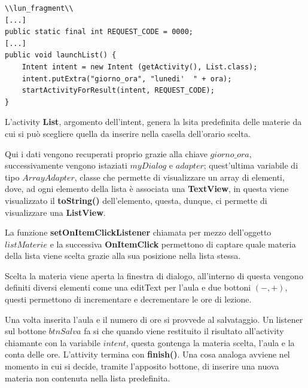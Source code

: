 \documentclass[a4paper, 50pt, twoside]{article}
\begin{document}
\begin{lstlisting}
\\lun_fragment\\
[...]
public static final int REQUEST_CODE = 0000;
[...]
public void launchList() {
	Intent intent = new Intent (getActivity(), List.class);
	intent.putExtra("giorno_ora", "lunedi'  " + ora);
	startActivityForResult(intent, REQUEST_CODE);
}
\end{lstlisting}

L'activity \textbf{List}, argomento dell'intent, genera la lsita predefinita delle materie da cui si può scegliere quella da inserire nella casella dell'orario scelta.

Qui i dati vengono recuperati proprio grazie alla chiave $giorno\_ora$, successivamente vengono istaziati $myDialog$ e $adapter$; quest'ultima variabile di tipo $ArrayAdapter$, classe che permette di visualizzare un array di elementi, dove, ad ogni elemento della lista è associata una \textbf{TextView}, in questa viene visualizzato il \textbf{toString()} dell'elemento, questa, dunque, ci permette di visualizzare una \textbf{ListView}.

La funzione \textbf{setOnItemClickListener} chiamata per mezzo dell'oggetto $listMaterie$ e la successiva \textbf{OnItemClick} permettono di captare quale materia della lista viene scelta grazie alla sua posizione nella lista stessa.

Scelta la materia viene aperta la finestra di dialogo, all'interno di questa vengono definiti diversi elementi come una editText per l'aula e due bottoni $(-,+)$, questi permettono di incrementare e decrementare le ore di lezione.

Una volta inserita l'aula e il numero di ore si provvede al salvataggio. Un listener sul bottone $btnSalva$ fa si che quando viene restituito il risultato all'activity chiamante con la variabile $intent$, questa gontenga la materia scelta, l'aula e la conta delle ore. L'attivity termina con \textbf{finish()}.
Una cosa analoga avviene nel momento in cui si decide, tramite l'apposito bottone, di inserire una nuova materia non contenuta nella lista predefinita.
\end{document}
